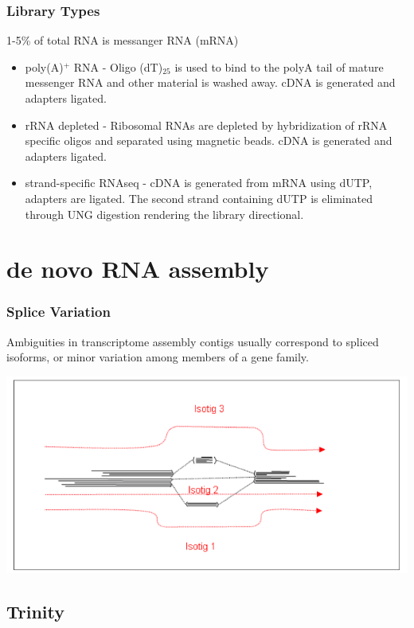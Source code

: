 \documentclass[pdf]{beamer}
\begin{document}
\begin{frame}
  \frametitle{Library Types}
  \centering\alert{1-5\% of total RNA is messanger RNA (mRNA)}
  \begin{itemize}
    \item poly(A)$^+$ RNA - Oligo (dT)$_{25}$ is used to bind to the polyA tail of mature messenger RNA and other material is washed away. cDNA is generated and adapters ligated.
    \item rRNA depleted - Ribosomal RNAs are depleted by hybridization of rRNA specific oligos and separated using magnetic beads. cDNA is generated and adapters ligated.
    \item strand-specific RNAseq - cDNA is generated from mRNA using dUTP, adapters are ligated. The second strand containing dUTP is eliminated through UNG digestion rendering the library directional.
  \end{itemize}
\end{frame}


\section{de novo RNA assembly}
\begin{frame}
\frametitle{Splice Variation}
Ambiguities in transcriptome assembly contigs usually correspond to spliced isoforms, or minor variation among members of a gene family.
\begin{center}
\includegraphics[scale=0.4]{Figures/spliceVariation.png} 
\end{center}
\end{frame}
\subsection{Trinity}
\end{document}
